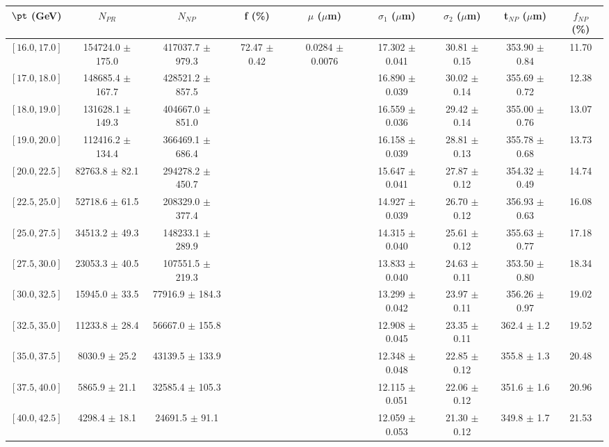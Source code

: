 \begin{tabular}{c||c|c|c|c|c|c|c||c}
$\pt$ (GeV) & $N_{PR}$ & $N_{NP}$ & f (\%) & $\mu$ ($\mu$m) & $\sigma_1$ ($\mu$m) & $\sigma_2$ ($\mu$m)  & t$_{NP}$ ($\mu$m) & $f_{NP}$ (\%) \\
\hline
$[16.0, 17.0]$ & 154724.0 $\pm$ 175.0 & 417037.7 $\pm$ 979.3 & \multirow{20}{*}{72.47 $\pm$ 0.42} & \multirow{20}{*}{0.0284 $\pm$ 0.0076} & 17.302 $\pm$ 0.041 & 30.81 $\pm$ 0.15 & 353.90 $\pm$ 0.84 & 11.70\\
$[17.0, 18.0]$ & 148685.4 $\pm$ 167.7 & 428521.2 $\pm$ 857.5 &  &  & 16.890 $\pm$ 0.039 & 30.02 $\pm$ 0.14 & 355.69 $\pm$ 0.72 & 12.38\\
$[18.0, 19.0]$ & 131628.1 $\pm$ 149.3 & 404667.0 $\pm$ 851.0 &  &  & 16.559 $\pm$ 0.036 & 29.42 $\pm$ 0.14 & 355.00 $\pm$ 0.76 & 13.07\\
$[19.0, 20.0]$ & 112416.2 $\pm$ 134.4 & 366469.1 $\pm$ 686.4 &  &  & 16.158 $\pm$ 0.039 & 28.81 $\pm$ 0.13 & 355.78 $\pm$ 0.68 & 13.73\\
$[20.0, 22.5]$ & 82763.8 $\pm$ 82.1 & 294278.2 $\pm$ 450.7 &  &  & 15.647 $\pm$ 0.041 & 27.87 $\pm$ 0.12 & 354.32 $\pm$ 0.49 & 14.74\\
$[22.5, 25.0]$ & 52718.6 $\pm$ 61.5 & 208329.0 $\pm$ 377.4 &  &  & 14.927 $\pm$ 0.039 & 26.70 $\pm$ 0.12 & 356.93 $\pm$ 0.63 & 16.08\\
$[25.0, 27.5]$ & 34513.2 $\pm$ 49.3 & 148233.1 $\pm$ 289.9 &  &  & 14.315 $\pm$ 0.040 & 25.61 $\pm$ 0.12 & 355.63 $\pm$ 0.77 & 17.18\\
$[27.5, 30.0]$ & 23053.3 $\pm$ 40.5 & 107551.5 $\pm$ 219.3 &  &  & 13.833 $\pm$ 0.040 & 24.63 $\pm$ 0.11 & 353.50 $\pm$ 0.80 & 18.34\\
$[30.0, 32.5]$ & 15945.0 $\pm$ 33.5 & 77916.9 $\pm$ 184.3 &  &  & 13.299 $\pm$ 0.042 & 23.97 $\pm$ 0.11 & 356.26 $\pm$ 0.97 & 19.02\\
$[32.5, 35.0]$ & 11233.8 $\pm$ 28.4 & 56667.0 $\pm$ 155.8 &  &  & 12.908 $\pm$ 0.045 & 23.35 $\pm$ 0.11 & 362.4 $\pm$ 1.2 & 19.52\\
$[35.0, 37.5]$ & 8030.9 $\pm$ 25.2 & 43139.5 $\pm$ 133.9 &  &  & 12.348 $\pm$ 0.048 & 22.85 $\pm$ 0.12 & 355.8 $\pm$ 1.3 & 20.48\\
$[37.5, 40.0]$ & 5865.9 $\pm$ 21.1 & 32585.4 $\pm$ 105.3 &  &  & 12.115 $\pm$ 0.051 & 22.06 $\pm$ 0.12 & 351.6 $\pm$ 1.6 & 20.96\\
$[40.0, 42.5]$ & 4298.4 $\pm$ 18.1 & 24691.5 $\pm$ 91.1 &  &  & 12.059 $\pm$ 0.053 & 21.30 $\pm$ 0.12 & 349.8 $\pm$ 1.7 & 21.53\\

\end{tabular}
